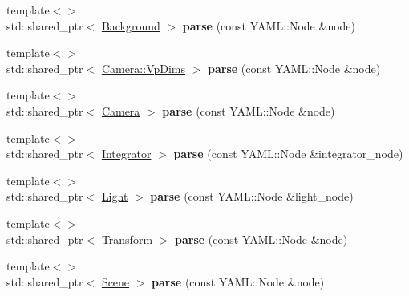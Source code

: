 \begin{DoxyCompactItemize}
{\footnotesize template$<$$>$ }\\std\+::shared\+\_\+ptr$<$ \mbox{\hyperlink{classomg_1_1_background}{Background}} $>$ {\bfseries parse} (const Y\+A\+M\+L\+::\+Node \&node)
\item 
\mbox{\label{classomg_1_1_y_a_m_l_parser_aa7a71ee4f00286dc22e14258b215bfc4}} 
{\footnotesize template$<$$>$ }\\std\+::shared\+\_\+ptr$<$ \mbox{\hyperlink{structomg_1_1_camera_1_1_vp_dims}{Camera\+::\+Vp\+Dims}} $>$ {\bfseries parse} (const Y\+A\+M\+L\+::\+Node \&node)
\item 
\mbox{\label{classomg_1_1_y_a_m_l_parser_aae786077463e555fc165bf237cd71835}} 
{\footnotesize template$<$$>$ }\\std\+::shared\+\_\+ptr$<$ \mbox{\hyperlink{classomg_1_1_camera}{Camera}} $>$ {\bfseries parse} (const Y\+A\+M\+L\+::\+Node \&node)
\item 
\mbox{\label{classomg_1_1_y_a_m_l_parser_a93084f0ddcf54201b05c2afd17768437}} 
{\footnotesize template$<$$>$ }\\std\+::shared\+\_\+ptr$<$ \mbox{\hyperlink{classomg_1_1_integrator}{Integrator}} $>$ {\bfseries parse} (const Y\+A\+M\+L\+::\+Node \&integrator\+\_\+node)
\item 
\mbox{\label{classomg_1_1_y_a_m_l_parser_a9d909cba439b132bcad0440079a1d436}} 
{\footnotesize template$<$$>$ }\\std\+::shared\+\_\+ptr$<$ \mbox{\hyperlink{classomg_1_1_light}{Light}} $>$ {\bfseries parse} (const Y\+A\+M\+L\+::\+Node \&light\+\_\+node)
\item 
\mbox{\label{classomg_1_1_y_a_m_l_parser_ab2784e632de78373c84466fb3ba652fb}} 
{\footnotesize template$<$$>$ }\\std\+::shared\+\_\+ptr$<$ \mbox{\hyperlink{classomg_1_1_transform}{Transform}} $>$ {\bfseries parse} (const Y\+A\+M\+L\+::\+Node \&node)
\item 
\mbox{\label{classomg_1_1_y_a_m_l_parser_a164befb2f6725d60dd2d127651497ec9}} 
{\footnotesize template$<$$>$ }\\std\+::shared\+\_\+ptr$<$ \mbox{\hyperlink{classomg_1_1_scene}{Scene}} $>$ {\bfseries parse} (const Y\+A\+M\+L\+::\+Node \&node)
\end{DoxyCompactItemize}


